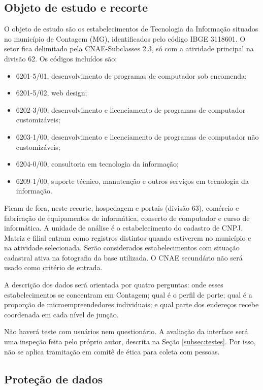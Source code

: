 \subsection{Objeto de estudo e recorte}

O objeto de estudo são os estabelecimentos de Tecnologia da Informação situados no município de Contagem (MG), identificados pelo código IBGE 3118601.
O setor fica delimitado pela CNAE-Subclasses 2.3, só com a atividade principal na divisão 62.
Os códigos incluídos são:

\begin{itemize}
    \item 6201-5/01, desenvolvimento de programas de computador sob encomenda;
    \item 6201-5/02, web design;
    \item 6202-3/00, desenvolvimento e licenciamento de programas de computador customizáveis;
    \item 6203-1/00, desenvolvimento e licenciamento de programas de computador não customizáveis;
    \item 6204-0/00, consultoria em tecnologia da informação;
    \item 6209-1/00, suporte técnico, manutenção e outros serviços em tecnologia da informação.
\end{itemize}

Ficam de fora, neste recorte, hospedagem e portais (divisão 63), comércio e fabricação de equipamentos de informática, conserto de computador e curso de informática.
A unidade de análise é o estabelecimento do cadastro de CNPJ.
Matriz e filial entram como registros distintos quando estiverem no município e na atividade selecionada.
Serão considerados estabelecimentos com situação cadastral ativa na fotografia da base utilizada.
O CNAE secundário não será usado como critério de entrada.

A descrição dos dados será orientada por quatro perguntas: onde esses estabelecimentos se concentram em Contagem; qual é o perfil de porte; qual é a proporção de microempreendedores individuais; e qual parte dos endereços recebe coordenada em cada nível de junção.

Não haverá teste com usuários nem questionário.
A avaliação da interface será uma inspeção feita pelo próprio autor, descrita na Seção \ref{subsec:testes}.
Por isso, não se aplica tramitação em comitê de ética para coleta com pessoas.

\subsection{Proteção de dados}

